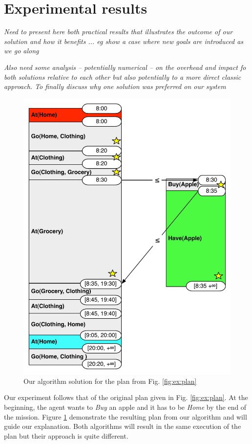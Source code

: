 
\section{Experimental results}
\label{sec:exp}

{\em\color{gray} Need to present here both practical results that illustrates the outcome of our solution and how it benefits ... eg show a case where new goals are introduced as we go along}

{\em\color{gray} Also need some analysis -- potentially numerical -- on the overhead and impact fo both solutions relative to each other but also potentially to a more direct classic approach. 
To finally discuss why one solution was preferred on our system} 

\begin{figure}
  \centering
  \includegraphics[width=0.8\columnwidth]{figs/example_MixedInitial}
  \caption{Our algorithm solution for the plan from Fig. \ref{fig:ex:plan}}
  \label{fig:ex:mixed1}
\end{figure}

Our experiment follows that of the original plan given in Fig. \ref{fig:ex:plan}. At the beginning, the
agent wants to {\em Buy} an apple and it has to be {\em Home} by the end of the mission. Figure \ref{fig:ex:mixed1} 
demonstrate the resulting plan from our algorithm and will guide our explanation. Both algorithms will
result in the same execution of the plan but their approach is quite different. 

